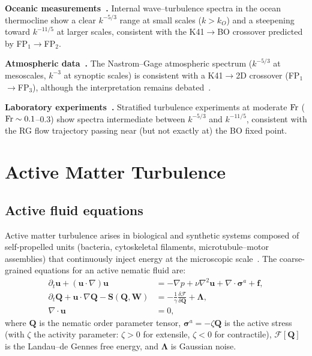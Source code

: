 \textbf{Oceanic measurements~\cite{van2014scaling,nash2004internal}.} Internal wave--turbulence spectra in the ocean thermocline show a clear $k^{-5/3}$ range at small scales ($k > k_O$) and a steepening toward $k^{-11/5}$ at larger scales, consistent with the K41$\to$BO crossover predicted by FP$_1$$\to$FP$_2$.

\textbf{Atmospheric data~\cite{lin1996aircraft,nastrom1984universal}.} The Nastrom--Gage atmospheric spectrum ($k^{-5/3}$ at mesoscales, $k^{-3}$ at synoptic scales) is consistent with a K41$\to$2D crossover (FP$_1$$\to$FP$_3$), although the interpretation remains debated~\cite{skamarock2004evaluating}.

\textbf{Laboratory experiments~\cite{augier2012experimental,laval2012experimental}.} Stratified turbulence experiments at moderate $\mathrm{Fr}$ ($\mathrm{Fr} \sim 0.1$--$0.3$) show spectra intermediate between $k^{-5/3}$ and $k^{-11/5}$, consistent with the RG flow trajectory passing near (but not exactly at) the BO fixed point.

\section{Active Matter Turbulence\label{sec:active}}

\subsection{Active fluid equations}

Active matter turbulence arises in biological and synthetic systems composed of self-propelled units (bacteria, cytoskeletal filaments, microtubule--motor assemblies) that continuously inject energy at the microscopic scale~\cite{ramaswamy2010hydrodynamics,markovich2021phenomenology,marchetti2013hydrodynamics}. The coarse-grained equations for an active nematic fluid are:
{\scriptsize
\begin{align}
 \partial_t \mathbf{u} + (\mathbf{u}\cdot\nabla)\mathbf{u} &= -\nabla p + \nu\nabla^2\mathbf{u} + \nabla\cdot\bm{\sigma}^a + \mathbf{f}, \\
\partial_t \mathbf{Q} + \mathbf{u}\cdot\nabla\mathbf{Q} - \mathbf{S}(\mathbf{Q},\mathbf{W}) &= -\frac{1}{\gamma}\frac{\delta\mathcal{F}}{\delta\mathbf{Q}} + \bm{\Lambda}, \\
\nabla\cdot\mathbf{u} &= 0,
\end{align}
}
where $\mathbf{Q}$ is the nematic order parameter tensor, $\bm{\sigma}^a = -\zeta\mathbf{Q}$ is the active stress (with $\zeta$ the activity parameter: $\zeta>0$ for extensile, $\zeta<0$ for contractile), $\mathcal{F}[\mathbf{Q}]$ is the Landau--de Gennes free energy, and $\bm{\Lambda}$ is Gaussian noise.

